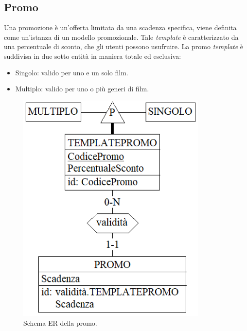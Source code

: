 \documentclass[a4paper,12pt]{report}
\begin{document}
	\subsection{Promo}
	Una promozione è un'offerta limitata da una scadenza specifica, viene definita come un'istanza di un modello promozionale. Tale \textit{template} è caratterizzato da una percentuale di sconto, che gli utenti possono usufruire. La promo \textit{template} è suddivisa in due sotto entità in maniera totale ed esclusiva:
	\begin{itemize}
			\item Singolo: valido per uno e un solo film.
			\item Multiplo: valido per uno o più generi di film.
	\end{itemize}
	\begin{figure}[H]
		\centering
		\includegraphics[width=270pt]{ER/promo.png}
		\caption{Schema ER della promo.}
	\end{figure}
\end{document}
